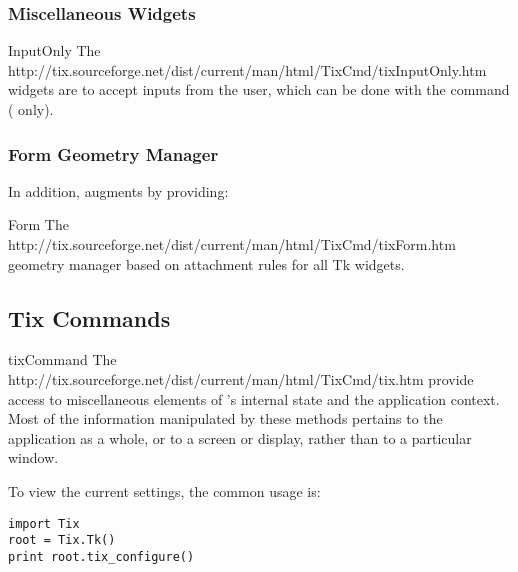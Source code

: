 \subsubsection{Miscellaneous Widgets}

\begin{classdesc}{InputOnly}{}
The 
{http://tix.sourceforge.net/dist/current/man/html/TixCmd/tixInputOnly.htm}
widgets are to accept inputs from the user, which can be done with the
 command (\UNIX{} only).
\end{classdesc}

\subsubsection{Form Geometry Manager}

In addition,  augments  by providing:

\begin{classdesc}{Form}{}
The 
{http://tix.sourceforge.net/dist/current/man/html/TixCmd/tixForm.htm}
geometry manager based on attachment rules for all Tk widgets.
\end{classdesc}


%

\subsection{Tix Commands}

\begin{classdesc}{tixCommand}{}
The 
{http://tix.sourceforge.net/dist/current/man/html/TixCmd/tix.htm}
provide access to miscellaneous elements of 's internal
state and the   application context.  Most of the information
manipulated by these methods pertains to the application as a whole,
or to a screen or display, rather than to a particular window.

To view the current settings, the common usage is:
\begin{verbatim}
import Tix
root = Tix.Tk()
print root.tix_configure()
\end{verbatim}
\end{classdesc}

